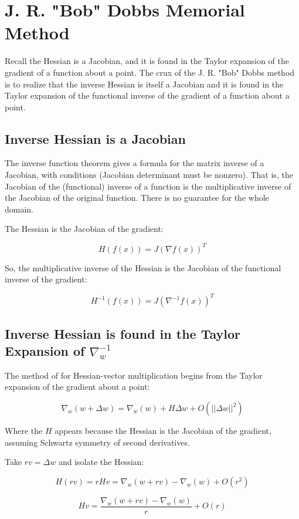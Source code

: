 \documentclass{article}
\begin{document}
\section{J. R. "Bob" Dobbs Memorial Method}

Recall the Hessian is a Jacobian, and it is found in the Taylor expansion of the gradient of a function about a point. The crux of the J. R. "Bob" Dobbs method is to realize that the inverse Hessian is itself a Jacobian and it is found in the Taylor expansion of the functional inverse of the gradient of a function about a point.

\subsection{Inverse Hessian is a Jacobian}

The inverse function theorem \cite{lang1995} gives a formula for the matrix inverse of a Jacobian, with conditions (Jacobian determinant must be nonzero). That is, the Jacobian of the (functional) inverse of a function is the multiplicative inverse of the Jacobian of the original function. There is no guarantee for the whole domain.

The Hessian is the Jacobian of the gradient:

$$H(f(x)) = J(\nabla f(x))^T $$

So, the multiplicative inverse of the Hessian is the Jacobian of the functional inverse of the gradient:

$$H^{-1}(f(x)) = J(\nabla^{-1} f(x))^T $$

\subsection{Inverse Hessian is found in the Taylor Expansion of $\nabla_w^{-1}$}

The method of \cite{pearlmutter1994} for Hessian-vector multiplication begins from the Taylor expansion of the gradient about a point:

$$\nabla_w (w + \Delta w) = \nabla_w (w) + H\Delta w + O(||\Delta w||^2)$$

Where the $H$ appears because the Hessian is the Jacobian of the gradient, assuming Schwartz symmetry of second derivatives.

Take $rv = \Delta w$ and isolate the Hessian:

$$H(rv) = rHv = \nabla_w(w + rv) - \nabla_w(w) + O(r^2)$$

$$Hv = \frac{\nabla_w(w + rv) - \nabla_w(w)}{r} + O(r)$$
\end{document}
